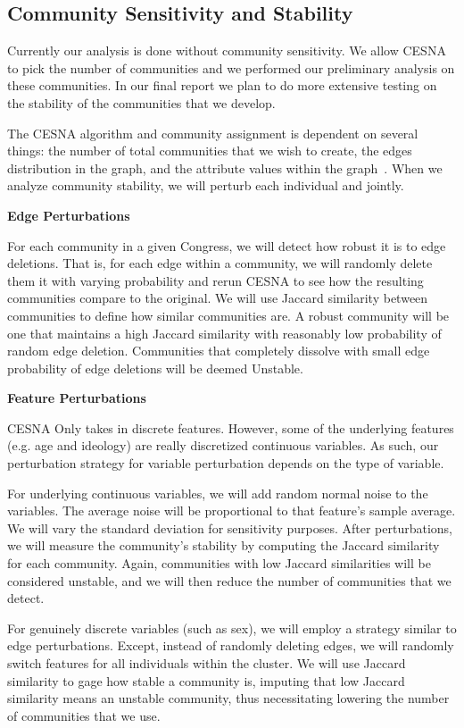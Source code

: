 \subsection{Community Sensitivity and Stability}

Currently our analysis is done without community sensitivity. We allow CESNA to
pick the number of communities and we performed our preliminary analysis on
these communities. In our final report we plan to do more extensive testing on
the stability of the communities that we develop.

The CESNA algorithm and community assignment is dependent on several things: the
number of total communities that we wish to create, the edges distribution in
the graph, and the attribute values within the graph~\cite{Tzerpos}. When we analyze community 
stability, we will perturb each individual and jointly.

\textbf{Edge Perturbations}

For each community in a given Congress, we will detect how robust it is to edge 
deletions. That is, for each edge within a community, we will randomly delete 
them it with varying probability and rerun CESNA to see how the resulting 
communities compare to the original. We will use Jaccard similarity between 
communities to define how similar communities are. A robust community will be 
one that maintains a high Jaccard similarity with reasonably low probability of 
random edge deletion. Communities that completely dissolve with small edge 
probability of edge deletions will be deemed Unstable.

\textbf{Feature Perturbations}

CESNA Only takes in discrete features. However, some of the underlying features 
(e.g. age and ideology) are really discretized continuous variables. As such, 
our perturbation strategy for variable perturbation depends on the type of 
variable.

For underlying continuous variables, we will add random normal noise to the
variables. The average noise will be proportional to that feature's sample
average. We will vary the standard deviation for sensitivity purposes. After
perturbations, we will measure the community's stability by computing the
Jaccard similarity for each community. Again, communities with low Jaccard
similarities will be considered unstable, and we will then reduce the number of
communities that we detect.

For genuinely discrete variables (such as sex), we will employ a strategy
similar to edge perturbations. Except, instead of randomly deleting edges, we
will randomly switch features for all individuals within the cluster. We will
use Jaccard similarity to gage how stable a community is, imputing that low 
Jaccard similarity means an unstable community, thus necessitating lowering 
the number of communities that we use.
